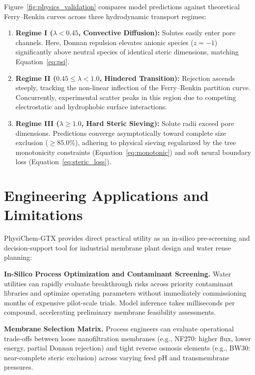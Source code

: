\documentclass[10pt,twocolumn]{article}
\begin{document}
Figure~\ref{fig:physics_validation} compares model predictions against theoretical Ferry--Renkin curves across three hydrodynamic transport regimes:
\begin{enumerate}[leftmargin=1.2em,itemsep=2pt]
\item \textbf{Regime I ($\lambda < 0.45$, Convective Diffusion):} Solutes easily enter pore channels. Here, Donnan repulsion elevates anionic species ($z=-1$) significantly above neutral species of identical steric dimensions, matching Equation~\ref{eq:psi}.
\item \textbf{Regime II ($0.45 \leq \lambda < 1.0$, Hindered Transition):} Rejection ascends steeply, tracking the non-linear inflection of the Ferry--Renkin partition curve. Concurrently, experimental scatter peaks in this region due to competing electrostatic and hydrophobic surface interactions.
\item \textbf{Regime III ($\lambda \geq 1.0$, Hard Steric Sieving):} Solute radii exceed pore dimensions. Predictions converge asymptotically toward complete size exclusion ($\ge 85.0\%$), adhering to physical sieving regularized by the tree monotonicity constraints (Equation~\ref{eq:monotonic}) and soft neural boundary loss (Equation~\ref{eq:steric_loss}).
\end{enumerate}

\section{Engineering Applications and Limitations}
\label{sec:implications}

PhysiChem-GTX provides direct practical utility as an in-silico pre-screening and decision-support tool for industrial membrane plant design and water reuse planning:

\textbf{In-Silico Process Optimization and Contaminant Screening.} Water utilities can rapidly evaluate breakthrough risks across priority contaminant libraries and optimize operating parameters without immediately commissioning months of expensive pilot-scale trials. Model inference takes milliseconds per compound, accelerating preliminary membrane feasibility assessments.

\textbf{Membrane Selection Matrix.} Process engineers can evaluate operational trade-offs between loose nanofiltration membranes (e.g., NF270: higher flux, lower energy, partial Donnan rejection) and tight reverse osmosis elements (e.g., BW30: near-complete steric exclusion) across varying feed pH and transmembrane pressures.
\end{document}
